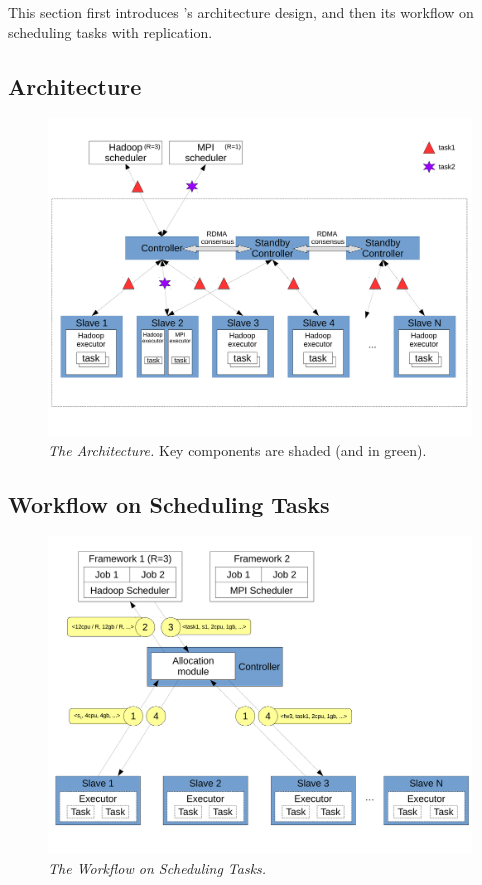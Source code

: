 This section first introduces \xxx's architecture design, and then its workflow 
on scheduling tasks with replication.


\subsection{Architecture} \label{sec:arch}

\begin{figure}[t]
\vspace{.20in}
\centering
\includegraphics[width=.47\textwidth]{figures/arch}
\vspace{.06in}
\caption{{\em The \xxx Architecture.} Key components are shaded (and 
in green).} \label{fig:arch}
\vspace{-.05in}
\end{figure}



\subsection{Workflow on Scheduling Tasks} \label{sec:workflow}

\begin{figure}[t]
\vspace{.20in}
\centering
\includegraphics[width=.47\textwidth]{figures/flow}
\vspace{.06in}
\caption{{\em The \xxx Workflow on Scheduling Tasks.}} \label{fig:workflow}
\vspace{-.05in}
\end{figure}

